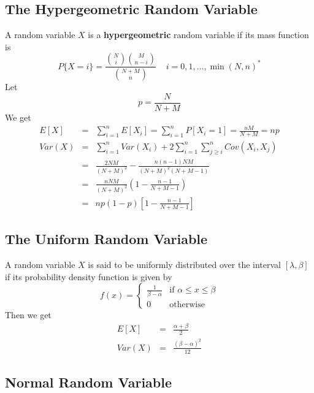 \documentclass[12pt]{article}
\begin{document}
\subsection{The Hypergeometric Random Variable}

A random variable $X$ is a \textbf{hypergeometric} random variable if its mass function is
\begin{equation*}
  P\{ X = i \} = \frac
  {\binom{N}{i} \binom{M}{n-i}}
  {\binom{N+M}{n}} \;\;\;\; i = 0,1,\dots,\min(N,n)^*
\end{equation*}
Let
\begin{equation*}
  p = \frac {N}{N+M}
\end{equation*}
We get
\begin{eqnarray*}
  E[X] &=& \sum_{i=1}^n E[X_i] = \sum_{i=1}^n P[X_i=1] = \frac{nM}{N+M} = np \\
  Var(X) &=& \sum_{i=1}^n Var(X_i) + 
  2 \sum_{i=1}^n \sum_{j \ge i}^n Cov(X_i, X_j) \\
  &=& \frac{2NM}{(N+M)^2} - \frac{n(n-1)NM}{(N+M)^2(N+M-1)} \\
  &=& \frac{nNM}{(N+M)^2} \left( 1 - \frac{n-1}{N+M-1} \right) \\
  &=& np(1-p) \left[ 1 - \frac{n-1}{N+M-1} \right]
\end{eqnarray*}

\subsection{The Uniform Random Variable}

A random variable $X$ is said to be uniformly distributed over the interval $[\lambda, \beta]$ if its probability density function is given by
\begin{equation*}
  f(x) = 
  \begin{cases}
    \frac{1}{\beta - \alpha} & \text{if } \alpha \le x \le \beta \\
    0 & \text{otherwise}
  \end{cases}
\end{equation*}
Then we get
\begin{eqnarray*}
  E[X] &=& \frac{\alpha + \beta}{2} \\
  Var(X) &=& \frac{(\beta - \alpha)^2}{12}
\end{eqnarray*}

\subsection{Normal Random Variable}
\end{document}
